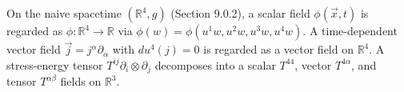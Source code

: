 On the naive spacetime $(\mathbb{R}^4, g)$ (Section 9.0.2), a scalar field $\phi(\vec{x}, t)$ is regarded as $\phi: \mathbb{R}^4 \to \mathbb{R}$ via $\phi(w) = \phi(u^1 w, u^2 w, u^3 w, u^4 w)$. A time-dependent vector field $\vec{j} = j^\alpha \partial_\alpha$ with $du^4(j) = 0$ is regarded as a vector field on $\mathbb{R}^4$. A stress-energy tensor $T^{ij} \partial_i \otimes \partial_j$ decomposes into a scalar $T^{44}$, vector $T^{4\alpha}$, and tensor $T^{\alpha\beta}$ fields on $\mathbb{R}^3$.